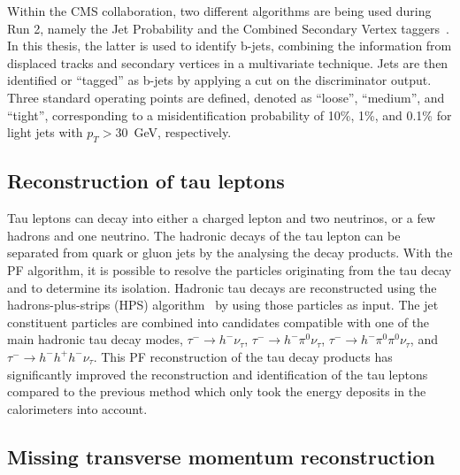 Within the \ac{CMS} collaboration, two different algorithms are being used during Run 2, namely the Jet Probability and the Combined Secondary Vertex taggers~\cite{Chatrchyan:2012jua}. In this thesis, the latter is used to identify b-jets, combining the information from displaced tracks and secondary vertices in a multivariate technique. Jets are then identified or ``tagged'' as b-jets by applying a cut on the discriminator output. Three standard operating points are defined, denoted as ``loose'', ``medium'', and ``tight'', corresponding to a misidentification probability of 10\%, 1\%, and 0.1\% for light jets with $p_T > 30$~GeV, respectively.
\subsection{Reconstruction of tau leptons}
\label{sec:tauID}

Tau leptons can decay into either a charged lepton and two neutrinos, or a few hadrons and one neutrino. The hadronic decays of the tau lepton can be separated from quark or gluon jets by the analysing the decay products. With the \ac{PF} algorithm, it is possible to resolve the particles originating from the tau decay and to determine its isolation. Hadronic tau decays are reconstructed using the hadrons-plus-strips (HPS) algorithm~\cite{Khachatryan:2015dfa} by using those particles as input. The jet constituent particles are combined into candidates compatible with one of the main hadronic tau decay modes, $\tau^- \rightarrow h^- \nu_{\tau}$, $\tau^- \rightarrow h^- \pi^0 \nu_{\tau}$, $\tau^- \rightarrow h^- \pi^0 \pi^0 \nu_{\tau}$, and $\tau^- \rightarrow h^- h^+ h^- \nu_{\tau}$. This \ac{PF} reconstruction of the tau decay products has significantly improved the reconstruction and identification of the tau leptons compared to the previous method which only took the energy deposits in the calorimeters into account.

\subsection{Missing transverse momentum reconstruction}
\label{sec:MET}

